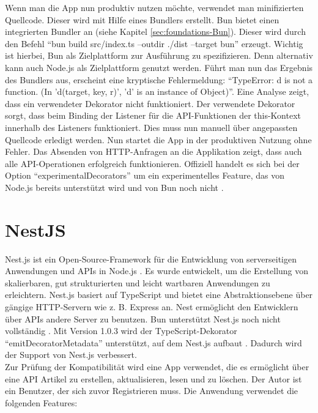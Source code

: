 {\noindent
Wenn man die App nun produktiv nutzen möchte, verwendet man minifizierten Quellcode. Dieser wird mit Hilfe eines Bundlers erstellt. Bun bietet einen integrierten Bundler an (siehe Kapitel \ref{sec:foundations-Bun}). Dieser wird durch den Befehl ``bun build src/index.ts --outdir ./dist --target bun'' erzeugt. Wichtig ist hierbei, Bun als Zielplattform zur Ausführung zu spezifizieren. Denn alternativ kann auch Node.js als Zielplattform genutzt werden. Führt man nun das Ergebnis des Bundlers aus, erscheint eine kryptische Fehlermeldung: ``TypeError: d is not a function. (In 'd(target, key, r)', 'd' is an instance of Object)''. Eine Analyse zeigt, dass ein verwendeter Dekorator nicht funktioniert. Der verwendete Dekorator sorgt, dass beim Binding der Listener für die API-Funktionen  der this-Kontext innerhalb des Listeners funktioniert. Dies muss nun manuell über angepassten Quellcode erledigt werden. Nun startet die App in der produktiven Nutzung ohne Fehler. Das Absenden von HTTP-Anfragen an die Applikation zeigt, dass auch alle API-Operationen erfolgreich funktionieren. Offiziell handelt es sich bei der Option ``experimentalDecorators'' um ein experimentelles Feature, das von Node.js bereits unterstützt wird und von Bun noch nicht \cite{Microsoft.2023}.

\section{NestJS} \label{sec:compabitility-existingProjects}
Nest.js ist ein Open-Source-Framework für die Entwicklung von serverseitigen Anwendungen und APIs in Node.js \cite{Mysliwiec.2023}. Es wurde entwickelt, um die Erstellung von skalierbaren, gut strukturierten und leicht wartbaren Anwendungen zu erleichtern. Nest.js basiert auf TypeScript und bietet eine Abstraktionsebene über gängige HTTP-Servern wie z. B. Express an. Nest ermöglicht den Entwicklern über APIs andere Server zu benutzen. Bun unterstützt Nest.js noch nicht vollständig \cite{Sumner.2022}. Mit Version 1.0.3 wird der TypeScript-Dekorator ``emitDecoratorMetadata'' unterstützt, auf dem Nest.js aufbaut \cite{McDonnel.}. Dadurch wird der Support von Nest.js verbessert.\\

\noindent
Zur Prüfung der Kompatibilität wird eine App verwendet, die es ermöglicht über eine API Artikel zu erstellen, aktualisieren, lesen und zu löschen. Der Autor ist ein Benutzer, der sich zuvor Registrieren muss. Die Anwendung verwendet die folgenden Features:

}
